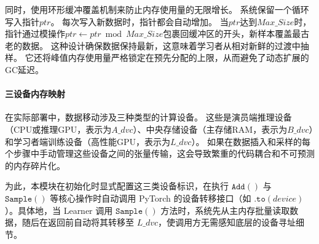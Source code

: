同时，使用环形缓冲覆盖机制来防止内存使用量的无限增长。 系统保留一个循环写入指针$ptr$。 每次写入新数据时，指针都会自动增加。 当$ptr$达到$Max\_Size$时，指针通过模操作$ptr \leftarrow ptr \bmod Max\_Size$包裹回缓冲区的开头，新样本覆盖最古老的数据。 这种设计确保数据保持最新，这意味着学习者从相对新鲜的过渡中抽样。 它还将峰值内存使用量严格锁定在预先分配的上限，从而避免了动态扩展的GC延迟。

\paragraph{三设备内存映射}

在实际部署中，数据移动涉及三种类型的计算设备。 这些是演员端推理设备（CPU或推理GPU，表示为$A\_dvc$）、中央存储设备（主存储RAM，表示为$B\_dvc$）和学习者端训练设备（高性能GPU，表示为$L\_dvc$）。 如果在数据插入和采样的每个步骤中手动管理这些设备之间的张量传输，这会导致繁重的代码耦合和不可预测的内存碎片化。

为此，本模块在初始化时显式配置这三类设备标识，在执行 $\texttt{Add}()$ 与 $\texttt{Sample}()$ 等核心操作时自动调用 PyTorch 的设备转移接口（如 $\texttt{.to}(device)$）。具体地，当 Learner 调用 $\texttt{Sample}()$ 方法时，系统先从主内存批量读取数据，随后在返回前自动将其转移至 $L\_dvc$，使调用方无需感知底层的设备寻址细节。

